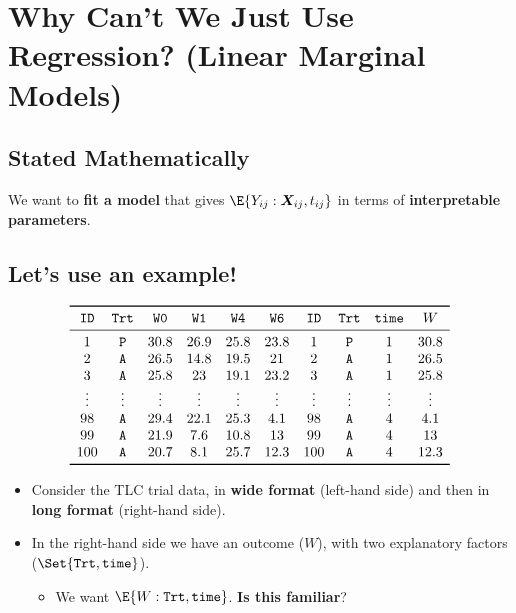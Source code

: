 \section{Why Can't We Just Use Regression? (Linear Marginal Models)}
\subsection*{Stated Mathematically}
We want to \textbf{fit a model} that gives
$ \E{Y_{ij}\given \Matrix{X}_{ij},t_{ij}} $
in terms of \textbf{interpretable parameters}.
\subsection*{Let's use an example!}
\[ \begin{array}{cccccccccc}
        \toprule
        \texttt{ID} & \texttt{Trt} & \texttt{W0} & \texttt{W1} & \texttt{W4} & \texttt{W6} & \texttt{ID} & \texttt{Trt} & \texttt{time} & W      \\
        \midrule
        1           & \texttt{P}   & 30.8        & 26.9        & 25.8        & 23.8        & 1           & \texttt{P}   & 1             & 30.8   \\
        2           & \texttt{A}   & 26.5        & 14.8        & 19.5        & 21          & 2           & \texttt{A}   & 1             & 26.5   \\
        3           & \texttt{A}   & 25.8        & 23          & 19.1        & 23.2        & 3           & \texttt{A}   & 1             & 25.8   \\
        \vdots      & \vdots       & \vdots      & \vdots      & \vdots      & \vdots      & \vdots      & \vdots       & \vdots        & \vdots \\
        98          & \texttt{A}   & 29.4        & 22.1        & 25.3        & 4.1         & 98          & \texttt{A}   & 4             & 4.1    \\
        99          & \texttt{A}   & 21.9        & 7.6         & 10.8        & 13          & 99          & \texttt{A}   & 4             & 13     \\
        100         & \texttt{A}   & 20.7        & 8.1         & 25.7        & 12.3        & 100         & \texttt{A}   & 4             & 12.3   \\
        \bottomrule
    \end{array} \]
\begin{itemize}
    \item Consider the TLC trial data, in \textbf{wide format} (left-hand side) and then in \textbf{long
              format} (right-hand side).
    \item In the right-hand side we have an outcome ($W$), with two explanatory factors
          \big($ \Set{\texttt{Trt},\texttt{time}} $\big).
          \begin{itemize}
              \item We want $ \E{W\given \texttt{Trt},\texttt{time}} $. \textbf{Is this familiar}?
          \end{itemize}
\end{itemize}
